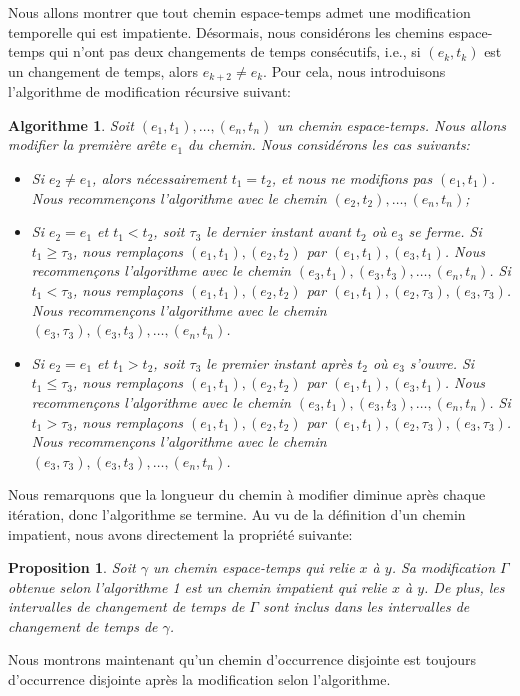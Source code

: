 \documentclass[titlepage,a4paper,12pt]{article}
\newcounter{d}
\newcounter{t}
\newcounter{p}
\newcounter{c}
\newcounter{a}
\newcounter{l}
\newtheorem{prop}[p]{Proposition}
\newtheorem{algo}[a]{Algorithme}
\begin{document}
Nous allons montrer que tout chemin espace-temps admet une modification temporelle qui est impatiente. Désormais, nous considérons les chemins espace-temps qui n'ont pas deux changements de temps consécutifs, i.e., si $(e_k,t_k)$ est un changement de temps, alors $e_{k+2} \neq e_k$. Pour cela, nous introduisons l'algorithme de modification récursive suivant:
\begin{algo} Soit $(e_1,t_1),\dots,(e_n,t_n)$ un chemin espace-temps. Nous allons modifier la première arête $e_1$ du chemin. Nous considérons les cas suivants:
\begin{itemize}[label = $\bullet$, leftmargin = *]
\item Si $e_2 \neq e_1$, alors nécessairement $t_1 = t_2$, et nous ne modifions pas $(e_1,t_1)$. Nous recommençons l'algorithme avec le chemin $(e_2,t_2),\dots,(e_n,t_n)$;
\item  Si $e_2 = e_1 $ et $t_1< t_2$, soit $\tau_3$ le dernier instant avant $t_2$ où $e_{3}$ se ferme. Si $t_1 \geqslant \tau_3$, nous remplaçons $(e_1,t_1),(e_2,t_2)$ par $(e_1,t_1),(e_3,t_1)$. Nous recommençons l'algorithme avec le chemin $(e_3,t_1),(e_3,t_3),\dots, (e_n,t_n)$. Si $t_1 < \tau_3$, nous remplaçons $(e_1,t_1),(e_2,t_2)$ par $(e_1,t_1),(e_2,\tau_3),(e_3,\tau_3)$. Nous recommençons l'algorithme avec le chemin $(e_3,\tau_3),(e_3,t_3),\dots,(e_n,t_n)$.
\item Si $e_2=e_1$ et $t_1 > t_2$, soit $\tau_3$ le premier instant après $t_2$ où $e_{3}$ s'ouvre. Si $t_1 \leqslant \tau_3$, nous remplaçons $(e_1,t_1),(e_2,t_2)$ par $(e_1,t_1),(e_3,t_1)$. Nous recommençons l'algorithme avec le chemin $(e_3,t_1),(e_3,t_3),\dots, (e_n,t_n)$. Si $t_1 > \tau_3$, nous remplaçons $(e_1,t_1),(e_2,t_2)$ par $(e_1,t_1),(e_2,\tau_3),(e_3,\tau_3)$. Nous recommençons l'algorithme avec le chemin $(e_3,\tau_3),(e_3,t_3),\dots,(e_n,t_n)$.
\end{itemize}
\end{algo}
Nous remarquons que la longueur du chemin à modifier diminue après chaque itération, donc l'algorithme se termine. Au vu de la définition d'un chemin impatient, nous avons directement la propriété suivante:
\begin{prop}
Soit $\gamma$ un chemin espace-temps qui relie $x$ à $y$. Sa modification $\Gamma$ obtenue selon l'algorithme 1 est un chemin impatient qui relie $x$ à $y$. De plus, les intervalles de changement de temps de $\Gamma$ sont inclus dans les intervalles de changement de temps de $\gamma$.
\end{prop}
Nous montrons maintenant qu'un chemin d'occurrence disjointe est toujours d'occurrence disjointe après la modification selon l'algorithme.
\end{document}
